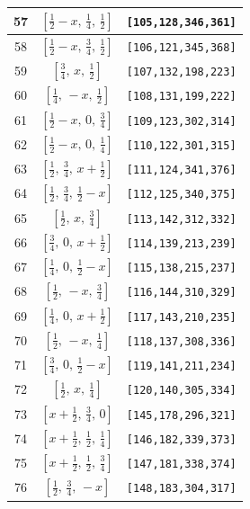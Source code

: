 \documentclass[fleqn,8pt]{jsarticle}
\begin{document}
\begin{longtable}{ccc}
57 & $\left[ \frac{1}{2} - x,\, \frac{1}{4},\, \frac{1}{2} \right]$ & {\tt [105,128,346,361]} \\ \hline
58 & $\left[ \frac{1}{2} - x,\, \frac{3}{4},\, \frac{1}{2} \right]$ & {\tt [106,121,345,368]} \\ \hline
59 & $\left[ \frac{3}{4},\, x,\, \frac{1}{2} \right]$ & {\tt [107,132,198,223]} \\ \hline
60 & $\left[ \frac{1}{4},\, - x,\, \frac{1}{2} \right]$ & {\tt [108,131,199,222]} \\ \hline
61 & $\left[ \frac{1}{2} - x,\, 0,\, \frac{3}{4} \right]$ & {\tt [109,123,302,314]} \\ \hline
62 & $\left[ \frac{1}{2} - x,\, 0,\, \frac{1}{4} \right]$ & {\tt [110,122,301,315]} \\ \hline
63 & $\left[ \frac{1}{2},\, \frac{3}{4},\, x + \frac{1}{2} \right]$ & {\tt [111,124,341,376]} \\ \hline
64 & $\left[ \frac{1}{2},\, \frac{3}{4},\, \frac{1}{2} - x \right]$ & {\tt [112,125,340,375]} \\ \hline
65 & $\left[ \frac{1}{2},\, x,\, \frac{3}{4} \right]$ & {\tt [113,142,312,332]} \\ \hline
66 & $\left[ \frac{3}{4},\, 0,\, x + \frac{1}{2} \right]$ & {\tt [114,139,213,239]} \\ \hline
67 & $\left[ \frac{1}{4},\, 0,\, \frac{1}{2} - x \right]$ & {\tt [115,138,215,237]} \\ \hline
68 & $\left[ \frac{1}{2},\, - x,\, \frac{3}{4} \right]$ & {\tt [116,144,310,329]} \\ \hline
69 & $\left[ \frac{1}{4},\, 0,\, x + \frac{1}{2} \right]$ & {\tt [117,143,210,235]} \\ \hline
70 & $\left[ \frac{1}{2},\, - x,\, \frac{1}{4} \right]$ & {\tt [118,137,308,336]} \\ \hline
71 & $\left[ \frac{3}{4},\, 0,\, \frac{1}{2} - x \right]$ & {\tt [119,141,211,234]} \\ \hline
72 & $\left[ \frac{1}{2},\, x,\, \frac{1}{4} \right]$ & {\tt [120,140,305,334]} \\ \hline
73 & $\left[ x + \frac{1}{2},\, \frac{3}{4},\, 0 \right]$ & {\tt [145,178,296,321]} \\ \hline
74 & $\left[ x + \frac{1}{2},\, \frac{1}{2},\, \frac{1}{4} \right]$ & {\tt [146,182,339,373]} \\ \hline
75 & $\left[ x + \frac{1}{2},\, \frac{1}{2},\, \frac{3}{4} \right]$ & {\tt [147,181,338,374]} \\ \hline
76 & $\left[ \frac{1}{2},\, \frac{3}{4},\, - x \right]$ & {\tt [148,183,304,317]} \\ \hline

\end{longtable}
\end{document}
